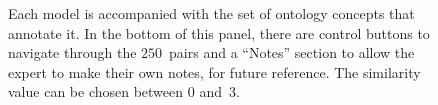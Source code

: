 \begin{figure}
    \centering
    \vspace{\baselineskip}
  
    \caption[The EBI Biomodels similarity assessment tool]%
    { Each model is accompanied with the set of ontology concepts that annotate it. In the bottom of this panel, there are control buttons to navigate through the $250$~pairs and a ``Notes'' section to allow the expert to make their own notes, for future reference.  The similarity value can be chosen between $0$ and~$3$.}
    \label{fig:biomd}
\end{figure}
